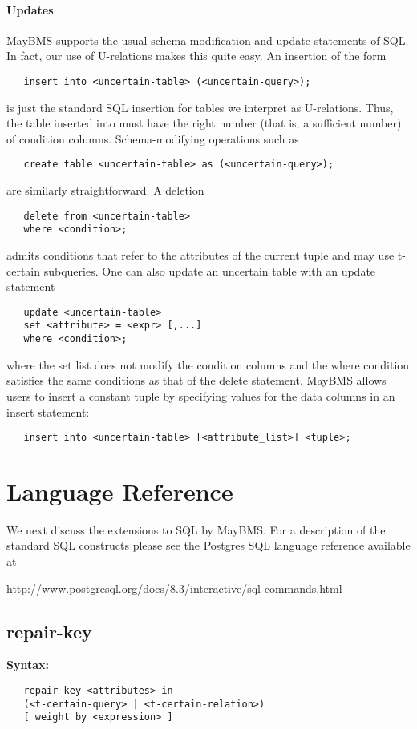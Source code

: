 \paragraph{Updates}
%
MayBMS supports the usual schema modification and update statements of SQL. In fact, our use of U-relations makes this quite easy.
An insertion of the form
\begin{verbatim}
   insert into <uncertain-table> (<uncertain-query>);
\end{verbatim}
is just the standard SQL insertion for tables we interpret as U-relations. Thus, the table inserted into must have the right number (that is, a sufficient number) of condition columns.
Schema-modifying operations such as
\begin{verbatim}
   create table <uncertain-table> as (<uncertain-query>);
\end{verbatim}
are similarly straightforward.
A deletion
\begin{verbatim}
   delete from <uncertain-table>
   where <condition>;
\end{verbatim}
admits conditions that refer to the attributes of the current tuple and may use t-certain subqueries.
One can also update an uncertain table with an update statement 
\begin{verbatim}
   update <uncertain-table>
   set <attribute> = <expr> [,...]
   where <condition>;
\end{verbatim}
where the set list does not modify the condition columns and the where condition satisfies the same conditions as that of the delete statement. MayBMS allows users to insert a constant tuple by specifying values for the data columns in an insert statement:
\begin{verbatim}
   insert into <uncertain-table> [<attribute_list>] <tuple>;
\end{verbatim}


\section{Language Reference}
\label{sec:langref} 

We next discuss the extensions to SQL by MayBMS.
For a description of the standard SQL constructs please see the Postgres SQL language reference available at

\url{http://www.postgresql.org/docs/8.3/interactive/sql-commands.html}


\subsection{repair-key}
\textbf{Syntax:}
\begin{verbatim}
   repair key <attributes> in 
   (<t-certain-query> | <t-certain-relation>)
   [ weight by <expression> ]
\end{verbatim}

